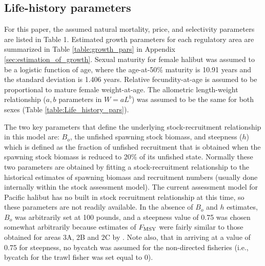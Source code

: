 \subsection*{Life-history parameters}%
\label{sub:life_history_parameters_and_price_information}
For this paper, the assumed natural mortality, price,  and selectivity parameters are listed in Table 1.  Estimated growth parameters for each regulatory area are summarized in Table \ref{table:growth_pars} in Appendix \ref{sec:estimation_of_growth}.  Sexual maturity for female halibut was assumed to be a logistic function of age, where the age-at-50\% maturity is 10.91 years and the standard deviation is 1.406 years.  Relative fecundity-at-age is assumed to be proportional to mature female weight-at-age.  The allometric length-weight relationship ($a,b$ parameters in $W = a L ^b$) was assumed to be the same for both sexes (Table \ref{table:Life_history_pars}).

The two key parameters that define the underlying stock-recruitment relationship in this model are: $B_o$, the unfished spawning stock biomass, and steepness ($h$) which is defined as the fraction of unfished recruitment that is obtained when the spawning stock biomass is reduced to 20\% of its unfished state.  Normally these two parameters are obtained by fitting a stock-recruitment relationship to the historical estimates of spawning biomass and recruitment numbers (usually done internally within the stock assessment model).  The current assessment model for Pacific halibut has no built in stock recruitment relationship at this time, so these parameters are not readily available.  In the absence of $B_o$ and $h$ estimates, $B_o$ was arbitrarily set at 100 pounds,  and a steepness value of 0.75 was chosen somewhat arbitrarily because estimates of $F_{\rm{MSY}}$ were fairly similar to those obtained for areas 3A, 2B and 2C by \cite{clark2006assessment}.  Note also, that in arriving at a value of 0.75 for steepness, no  bycatch was assumed for the non-directed fisheries (i.e., bycatch for the trawl fisher was set equal to 0).



